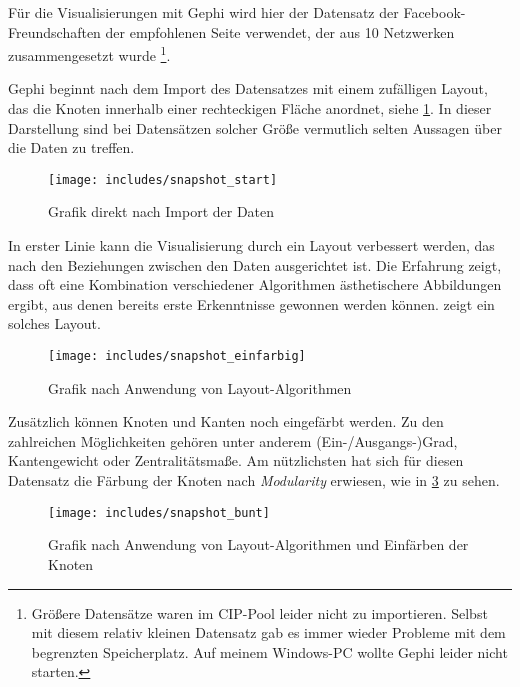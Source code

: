 \documentclass[a4paper,12pt,ngerman]{scrartcl}
\begin{document}
Für die Visualisierungen mit Gephi wird hier der Datensatz der Facebook-Freundschaften der empfohlenen Seite verwendet, der aus 10 Netzwerken zusammengesetzt wurde \footnote{Größere Datensätze waren im CIP-Pool leider nicht zu importieren. Selbst mit diesem relativ kleinen Datensatz gab es immer wieder Probleme mit dem begrenzten Speicherplatz. Auf meinem Windows-PC wollte Gephi leider nicht starten.}.

Gephi beginnt nach dem Import des Datensatzes mit einem zufälligen Layout, das die Knoten innerhalb einer rechteckigen Fläche anordnet, siehe \cref{fig:start}. In dieser Darstellung sind bei Datensätzen solcher Größe vermutlich selten Aussagen über die Daten zu treffen.

\begin{figure}[ht]
    \centering
    \texttt{[image: includes/snapshot\_start]}
    \caption{Grafik direkt nach Import der Daten}
    \label{fig:start}
\end{figure}

In erster Linie kann die Visualisierung durch ein Layout verbessert werden, das nach den Beziehungen zwischen den Daten ausgerichtet ist. Die Erfahrung zeigt, dass oft eine Kombination verschiedener Algorithmen ästhetischere Abbildungen ergibt, aus denen bereits erste Erkenntnisse gewonnen werden können.  zeigt ein solches Layout.

\begin{figure}[ht]
    \centering
    \texttt{[image: includes/snapshot\_einfarbig]}
    \caption{Grafik nach Anwendung von Layout-Algorithmen}
    \label{fig:einfarbig}
\end{figure}

Zusätzlich können Knoten und Kanten noch eingefärbt werden. Zu den zahlreichen Möglichkeiten gehören unter anderem (Ein-/Ausgangs-)Grad, Kantengewicht oder Zentralitätsmaße. Am nützlichsten hat sich für diesen Datensatz die Färbung der Knoten nach \emph{Modularity} erwiesen, wie in \cref{fig:bunt} zu sehen.

\begin{figure}[ht]
    \centering
    \texttt{[image: includes/snapshot\_bunt]}
    \caption{Grafik nach Anwendung von Layout-Algorithmen und Einfärben der Knoten}
    \label{fig:bunt}
\end{figure}
\end{document}
